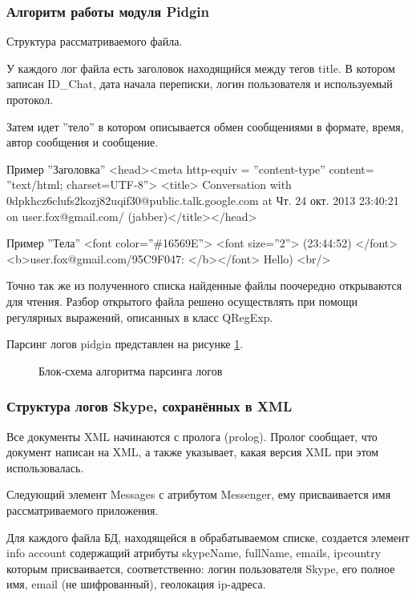 \subsubsection{Алгоритм работы модуля Pidgin}

Структура рассматриваемого файла. 

У каждого лог файла есть заголовок находящийся между тегов title. В котором записан ID\_Chat, дата начала переписки, логин пользователя и используемый протокол.

Затем идет ''тело'' в котором описывается обмен сообщениями в формате, время, автор сообщения и сообщение.

Пример ''Заголовка'' \ttfamily <head><meta http-equiv = ''content-type'' content= ''text/html; charset=UTF-8''> <title> Conversation with 0dpkhcz6clufs2kozj82uqif30@public.talk.google.com at Чт. 24 окт. 2013 23:40:21 on user.fox@gmail.com/ (jabber)</title></head>\normalfont

Пример ''Тела'' \ttfamily <font color=''\#16569E''> <font size=''2''> (23:44:52) </font> <b>user.fox@gmail.com/95C9F047: </b></font> Hello) <br/>\normalfont

Точно так же из полученного списка найденные файлы поочередно открываются для чтения. Разбор открытого файла решено осуществлять при помощи регулярных выражений, описанных в класс QRegExp.

Парсинг логов pidgin представлен на рисунке \ref{pic:Pars_pidgin_log}.

\begin{figure}[h]
\caption{Блок-схема алгоритма парсинга логов}
\label{pic:Pars_pidgin_log}
\end{figure}

\subsubsection{Структура логов Skype, сохранённых в XML}

Все документы XML начинаются с пролога (prolog). Пролог сообщает, что документ написан на XML, а также указывает, какая версия XML при этом использовалась.  

Следующий элемент Messages с атрибутом Messenger, ему присваивается имя рассматриваемого приложения.

Для каждого файла БД, находящейся в обрабатываемом списке, создается элемент info account содержащий атрибуты skypeName, fullName, emails, ipcountry которым присваивается, соответственно: логин пользователя Skype, его полное имя, email (не шифрованный), геолокация ip-адреса.  

